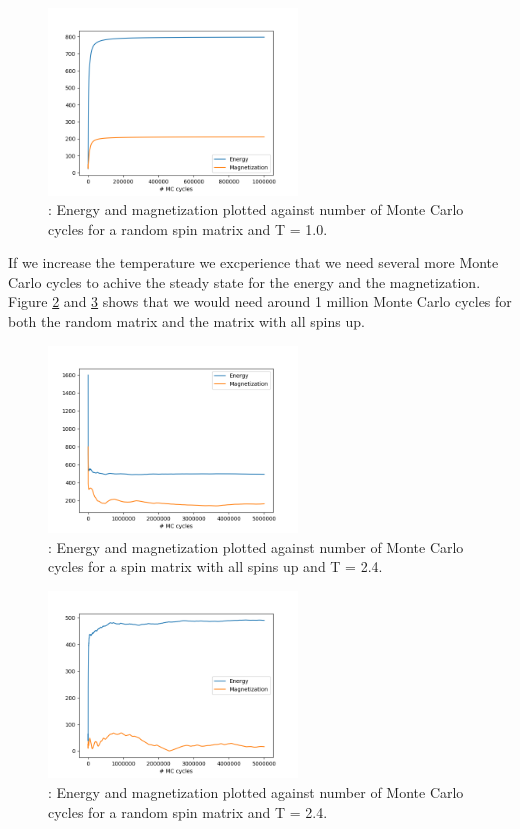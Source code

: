 \documentclass{article}
\begin{document}
{\begin{figure}[hbt]
\begin{center}
    \includegraphics[width=250px]{./plot/random_L20_1mill.png}
    \caption{: Energy and magnetization plotted against number of Monte Carlo cycles for a random spin matrix and T = 1.0.}
    \label{fig:steady_E_random}
\end{center}
\end{figure}

If we increase the temperature we excperience that we need several more Monte Carlo cycles to achive the steady state for the energy and the magnetization. Figure \ref{fig:steady_E_highT} and \ref{fig:steady_E_hihT_random} shows that we would need around 1 million Monte Carlo cycles for both the random matrix and the matrix with all spins up.

\begin{figure}[hbt]
\begin{center}
    \includegraphics[width=250px]{./plot/L20_5mill_highT.png}
    \caption{: Energy and magnetization plotted against number of Monte Carlo cycles for a spin matrix with all spins up and T = 2.4. }
    \label{fig:steady_E_highT}
\end{center}
\end{figure}

\begin{figure}[hbt]
\begin{center}
    \includegraphics[width=250px]{./plot/random_L20_5mill_highT.png}
    \caption{: Energy and magnetization plotted against number of Monte Carlo cycles for a random spin matrix and T = 2.4.}
    \label{fig:steady_E_hihT_random}
\end{center}
\end{figure}

}
\end{document}
